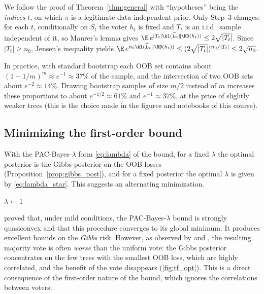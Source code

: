 \begin{proofsketch}
We follow the proof of Theorem~\ref{thm:general} with ``hypotheses'' being the
\emph{indices} $t$, on which $\pi$ is a legitimate data-independent prior. Only
Step~3 changes: for each $t$, conditionally on $S_t$ the voter $h_t$ is fixed
and $T_t$ is an i.i.d.\ sample independent of it, so Maurer's lemma gives
$\E\,e^{|T_t|\kl(\widehat L_t\|\RD(h_t))}\leq2\sqrt{|T_t|}$. Since $|T_t|\geq n_0$,
Jensen's inequality yields $\E\,e^{n_0\kl(\widehat L_t\|\RD(h_t))}\leq(2\sqrt{|T_t|})^{n_0/|T_t|}\leq2\sqrt{n_0}$.
\end{proofsketch}

In practice, with standard bootstrap each OOB set contains about
$(1-1/m)^m\approx e^{-1}\approx37\%$ of the sample, and the intersection of two OOB
sets about $e^{-2}\approx14\%$. Drawing bootstrap samples of size $m/2$ instead
of $m$ increases these proportions to about $e^{-1/2}\approx61\%$ and
$e^{-1}\approx37\%$, at the price of slightly weaker trees (this is the choice
made in the figures and notebooks of this course).

\subsection{Minimizing the first-order bound}\label{sec:algo_fo}

With the PAC-Bayes-$\lambda$ form \eqref{eq:lambda} of the bound, for a fixed
$\lambda$ the optimal posterior is the Gibbs posterior on the OOB losses
(Proposition~\ref{prop:gibbs_post}), and for a fixed posterior the optimal $\lambda$ is
given by \eqref{eq:lambda_star}. This suggests an alternating minimization.

\begin{algorithm}[h]
\caption{PAC-Bayes-$\lambda$ minimization for a forest \citep{thiemann2017strongly}}\label{algo:fo}
$\lambda\leftarrow1$\;
\end{algorithm}

\citet{thiemann2017strongly} proved that, under mild conditions, the
PAC-Bayes-$\lambda$ bound is strongly quasiconvex and that this procedure
converges to its global minimum. It produces excellent bounds on the
\emph{Gibbs} risk. However, as observed by \citet{lorenzen2019pac} and
\citet{masegosa2020second}, the resulting majority vote is often \emph{worse}
than the uniform vote: the Gibbs posterior concentrates on the few trees with
the smallest OOB loss, which are highly correlated, and the benefit of the vote
disappears (\cref{fig:rf_opt}). This is a direct consequence of the first-order
nature of the bound, which ignores the correlations between voters.

